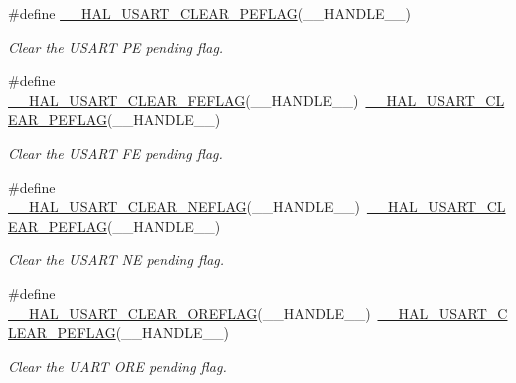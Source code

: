 \begin{DoxyCompactItemize}
\#define \hyperlink{group___u_s_a_r_t___exported___macros_ga8d03cf61b8ec17b505cb4eac48333632}{\+\_\+\+\_\+\+H\+A\+L\+\_\+\+U\+S\+A\+R\+T\+\_\+\+C\+L\+E\+A\+R\+\_\+\+P\+E\+F\+L\+AG}(\+\_\+\+\_\+\+H\+A\+N\+D\+L\+E\+\_\+\+\_\+)
\begin{DoxyCompactList}\small\item\em Clear the U\+S\+A\+RT PE pending flag. \end{DoxyCompactList}\item 
\#define \hyperlink{group___u_s_a_r_t___exported___macros_ga816bc7a3be6d6a96e4b69078679d9d4c}{\+\_\+\+\_\+\+H\+A\+L\+\_\+\+U\+S\+A\+R\+T\+\_\+\+C\+L\+E\+A\+R\+\_\+\+F\+E\+F\+L\+AG}(\+\_\+\+\_\+\+H\+A\+N\+D\+L\+E\+\_\+\+\_\+)~\hyperlink{group___u_s_a_r_t___exported___macros_ga8d03cf61b8ec17b505cb4eac48333632}{\+\_\+\+\_\+\+H\+A\+L\+\_\+\+U\+S\+A\+R\+T\+\_\+\+C\+L\+E\+A\+R\+\_\+\+P\+E\+F\+L\+AG}(\+\_\+\+\_\+\+H\+A\+N\+D\+L\+E\+\_\+\+\_\+)
\begin{DoxyCompactList}\small\item\em Clear the U\+S\+A\+RT FE pending flag. \end{DoxyCompactList}\item 
\#define \hyperlink{group___u_s_a_r_t___exported___macros_ga740fe9f08804ae46a8421a4ecc81a734}{\+\_\+\+\_\+\+H\+A\+L\+\_\+\+U\+S\+A\+R\+T\+\_\+\+C\+L\+E\+A\+R\+\_\+\+N\+E\+F\+L\+AG}(\+\_\+\+\_\+\+H\+A\+N\+D\+L\+E\+\_\+\+\_\+)~\hyperlink{group___u_s_a_r_t___exported___macros_ga8d03cf61b8ec17b505cb4eac48333632}{\+\_\+\+\_\+\+H\+A\+L\+\_\+\+U\+S\+A\+R\+T\+\_\+\+C\+L\+E\+A\+R\+\_\+\+P\+E\+F\+L\+AG}(\+\_\+\+\_\+\+H\+A\+N\+D\+L\+E\+\_\+\+\_\+)
\begin{DoxyCompactList}\small\item\em Clear the U\+S\+A\+RT NE pending flag. \end{DoxyCompactList}\item 
\#define \hyperlink{group___u_s_a_r_t___exported___macros_gacf8140c2c877760459410dfa3cf2f4b3}{\+\_\+\+\_\+\+H\+A\+L\+\_\+\+U\+S\+A\+R\+T\+\_\+\+C\+L\+E\+A\+R\+\_\+\+O\+R\+E\+F\+L\+AG}(\+\_\+\+\_\+\+H\+A\+N\+D\+L\+E\+\_\+\+\_\+)~\hyperlink{group___u_s_a_r_t___exported___macros_ga8d03cf61b8ec17b505cb4eac48333632}{\+\_\+\+\_\+\+H\+A\+L\+\_\+\+U\+S\+A\+R\+T\+\_\+\+C\+L\+E\+A\+R\+\_\+\+P\+E\+F\+L\+AG}(\+\_\+\+\_\+\+H\+A\+N\+D\+L\+E\+\_\+\+\_\+)
\begin{DoxyCompactList}\small\item\em Clear the U\+A\+RT O\+RE pending flag. \end{DoxyCompactList}\item 

\end{DoxyCompactItemize}
